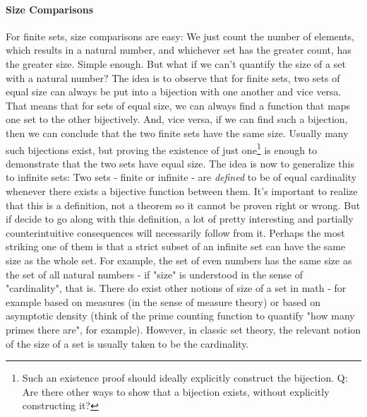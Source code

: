 \paragraph{Size Comparisons}
For finite sets, size comparisons are easy: We just count the number of elements, which results in a natural number, and whichever set has the greater count, has the greater size. Simple enough. But what if we can't quantify the size of a set with a natural number? The idea is to observe that for finite sets, two sets of equal size can always be put into a bijection with one another and vice versa. That means that for sets of equal size, we can always find a function that maps one set to the other bijectively. And, vice versa, if we can find such a bijection, then we can conclude that the two finite sets have the same size. Usually many such bijections exist, but proving the existence of just one\footnote{Such an existence proof should ideally explicitly construct the bijection. Q: Are there other ways to show that a bijection exists, without explicitly constructing it?} is enough to demonstrate that the two sets have equal size. The idea is now to generalize this to infinite sets: Two sets - finite or infinite - are \emph{defined} to be of equal cardinality whenever there exists a bijective function between them. It's important to realize that this is a definition, not a theorem so it cannot be proven right or wrong. But if decide to go along with this definition, a lot of pretty interesting and partially counterintuitive consequences will necessarily follow from it. Perhaps the most striking one of them is that a strict subset of an infinite set can have the same size as the whole set. For example, the set of even numbers has the same size as the set of all natural numbers - if "size" is understood in the sense of "cardinality", that is. There do exist other notions of size of a set in math - for example based on measures (in the sense of measure theory) or based on asymptotic density (think of the prime counting function to quantify "how many primes there are", for example). However, in classic set theory, the relevant notion of the size of a set is usually taken to be the cardinality.


